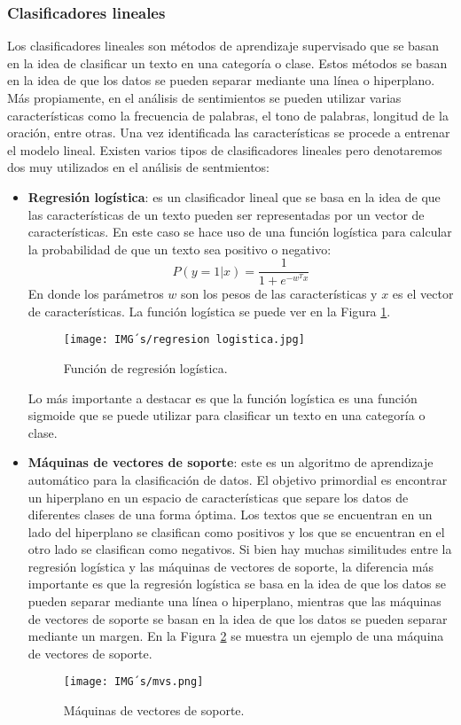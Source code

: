\documentclass[12pt, conference]{IEEEtran}
\begin{document}
\subsubsection{Clasificadores lineales}

Los clasificadores lineales son métodos de aprendizaje supervisado que se basan en la idea de clasificar un texto en una categoría o clase. Estos métodos se basan en la idea de que los datos se pueden separar mediante una línea o hiperplano. Más propiamente, en el análisis de sentimientos se pueden utilizar varias características como la frecuencia de palabras, el tono de palabras, longitud de la oración, entre otras. Una vez identificada las características se procede a entrenar el modelo lineal. Existen varios tipos de clasificadores lineales pero denotaremos dos muy utilizados en el análisis de sentmientos:
\begin{itemize}
  \item \textbf{Regresión logística}: es un clasificador lineal que se basa en la idea de que las características de un texto pueden ser representadas por un vector de características. En este caso se hace uso de una función logística para calcular la probabilidad de que un texto sea positivo o negativo:
  \begin{equation}
    P(y=1|x) = \frac{1}{1 + e^{-w^Tx}}
  \end{equation}
  En donde los parámetros $w$ son los pesos de las características y $x$ es el vector de características. La función logística se puede ver en la Figura \ref{fig15}.
  \begin{figure}
    \centering
    \texttt{[image: IMG´s/regresion logistica.jpg]}
    \caption{Función de regresión logística.}
    \label{fig15}
  \end{figure}
  Lo más importante a destacar es que la función logística es una función sigmoide que se puede utilizar para clasificar un texto en una categoría o clase.
  \item \textbf{Máquinas de vectores de soporte}: este es un algoritmo de aprendizaje automático para la clasificación de datos. El objetivo primordial es encontrar un hiperplano en un espacio de características que separe los datos de diferentes clases de una forma óptima. Los textos que se encuentran en un lado del hiperplano se clasifican como positivos y los que se encuentran en el otro lado se clasifican como negativos. Si bien hay muchas similitudes entre la regresión logística y las máquinas de vectores de soporte, la diferencia más importante es que la regresión logística se basa en la idea de que los datos se pueden separar mediante una línea o hiperplano, mientras que las máquinas de vectores de soporte se basan en la idea de que los datos se pueden separar mediante un margen. En la Figura \ref{fig16} se muestra un ejemplo de una máquina de vectores de soporte.
  \begin{figure}
    \centering
    \texttt{[image: IMG´s/mvs.png]}
    \caption{Máquinas de vectores de soporte.}
    \label{fig16}
  \end{figure}


\end{itemize}
\end{document}
